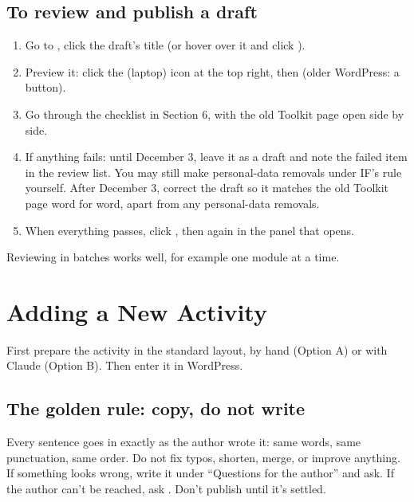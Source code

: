 \subsection*{To review and publish a draft}
\begin{enumerate}
  \item Go to , click the draft's title (or hover over it and click ).
  \item Preview it: click the  (laptop) icon at the top right, then  (older WordPress: a  button).
  \item Go through the checklist in Section 6, with the old Toolkit page open side by side.
  \item If anything fails: until December 3, leave it as a draft and note the failed item in the review list. You may still make personal-data removals under IF's rule yourself. After December 3, correct the draft so it matches the old Toolkit page word for word, apart from any personal-data removals.
  \item When everything passes, click , then  again in the panel that opens.
\end{enumerate}
Reviewing in batches works well, for example one module at a time.

\section{Adding a New Activity}
First prepare the activity in the standard layout, by hand (Option A) or with Claude (Option B). Then enter it in WordPress.

\subsection*{The golden rule: copy, do not write}
Every sentence goes in exactly as the author wrote it: same words, same punctuation, same order. Do not fix typos, shorten, merge, or improve anything. If something looks wrong, write it under ``Questions for the author'' and ask. If the author can't be reached, ask . Don't publish until it's settled.

